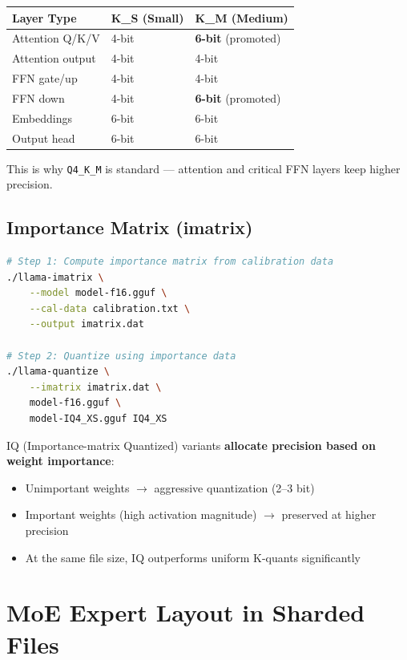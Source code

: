 \documentclass[11pt,a4paper]{article}
\begin{document}
\begin{center}
\begin{tabular}{lll}
\toprule
\textbf{Layer Type} & \textbf{K\_S (Small)} & \textbf{K\_M (Medium)} \\
\midrule
Attention Q/K/V & 4-bit & \textbf{6-bit} (promoted) \\
Attention output & 4-bit & 4-bit \\
FFN gate/up & 4-bit & 4-bit \\
FFN down & 4-bit & \textbf{6-bit} (promoted) \\
Embeddings & 6-bit & 6-bit \\
Output head & 6-bit & 6-bit \\
\bottomrule
\end{tabular}
\end{center}

This is why \texttt{Q4\_K\_M} is standard --- attention and critical FFN layers keep higher precision.

\subsection{Importance Matrix (imatrix)}

\begin{lstlisting}[language=bash, caption={Computing Importance Matrix for Better Quantization}]
# Step 1: Compute importance matrix from calibration data
./llama-imatrix \
    --model model-f16.gguf \
    --cal-data calibration.txt \
    --output imatrix.dat

# Step 2: Quantize using importance data
./llama-quantize \
    --imatrix imatrix.dat \
    model-f16.gguf \
    model-IQ4_XS.gguf IQ4_XS
\end{lstlisting}

IQ (Importance-matrix Quantized) variants \textbf{allocate precision based on weight importance}:
\begin{itemize}[itemsep=1pt]
  \item Unimportant weights $\to$ aggressive quantization (2--3 bit)
  \item Important weights (high activation magnitude) $\to$ preserved at higher precision
  \item At the same file size, IQ outperforms uniform K-quants significantly
\end{itemize}

\section{MoE Expert Layout in Sharded Files}
\end{document}

